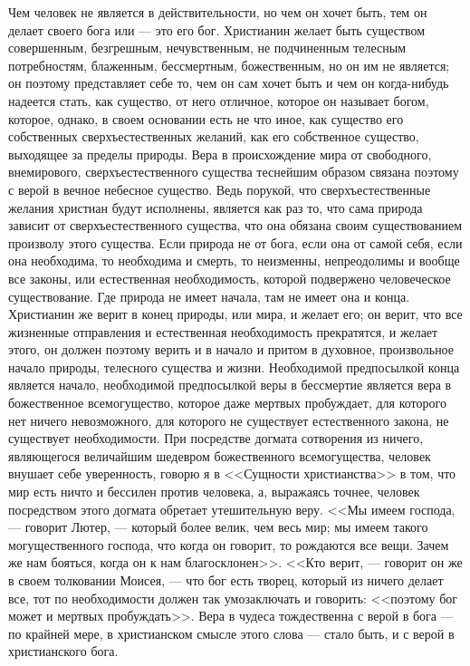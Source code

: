 \documentclass[12pt]{article}
\begin{document}
Чем человек не является в действительности, но чем он хочет быть, тем он делает своего бога или --- это его бог. Христианин желает быть существом совершенным, безгрешным, нечувственным, не подчиненным телесным потребностям, блаженным, бессмертным, божественным, но он им не является; он поэтому представляет себе то, чем он сам хочет быть и чем он когда-нибудь надеется стать, как существо, от него отличное, которое он называет богом, которое, однако, в своем основании есть не что иное, как существо его собственных сверхъестественных желаний, как его собственное существо, выходящее за пределы природы. Вера в происхождение мира от свободного, внемирового, сверхъестественного существа теснейшим образом связана поэтому с верой в вечное небесное существо. Ведь порукой, что сверхъестественные желания христиан будут исполнены, является как раз то, что сама природа зависит от сверхъестественного существа, что она обязана своим существованием произволу этого существа. Если природа не от бога, если она от самой себя, если она необходима, то необходима и смерть, то неизменны, непреодолимы и вообще все законы, или естественная необходимость, которой подвержено человеческое существование. Где природа не имеет начала, там не имеет она и конца. Христианин же верит в конец природы, или мира, и желает его; он верит, что все жизненные отправления и естественная необходимость прекратятся, и желает этого, он должен поэтому верить и в начало и притом в духовное, произвольное начало природы, телесного существа и жизни. Необходимой предпосылкой конца является начало, необходимой предпосылкой веры в бессмертие является вера в божественное всемогущество, которое даже мертвых пробуждает, для которого нет ничего невозможного, для которого не существует естественного закона, не существует необходимости. При посредстве догмата сотворения из ничего, являющегося величайшим шедевром божественного всемогущества, человек внушает себе уверенность, говорю я в <<Сущности христианства>> в том, что мир есть ничто и бессилен против человека, а, выражаясь точнее, человек посредством этого догмата обретает утешительную веру. <<Мы имеем господа, --- говорит Лютер, --- который более велик, чем весь мир; мы имеем такого могущественного господа, что когда он говорит, то рождаются все вещи. Зачем же нам бояться, когда он к нам благосклонен>>. <<Кто верит, --- говорит он же в своем толковании Моисея, --- что бог есть творец, который из ничего делает все, тот по необходимости должен так умозаключать и говорить: <<поэтому бог может и мертвых пробуждать>>. Вера в чудеса тождественна с верой в бога --- по крайней мере, в христианском смысле этого слова --- стало быть, и с верой в христианского бога. 
\end{document}
